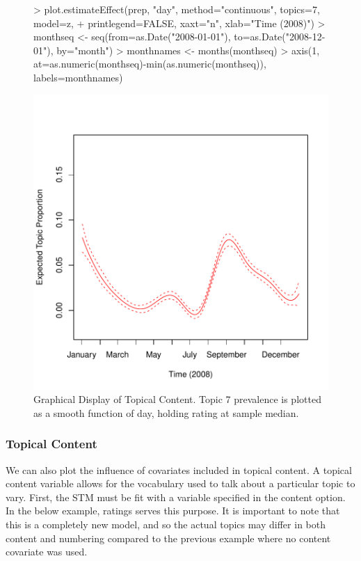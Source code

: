 \documentclass[nojss]{jss}
\begin{document}
\begin{figure}[t!]
\begin{center}
\begin{Schunk}
\begin{Sinput}
> plot.estimateEffect(prep, "day", method="continuous", topics=7, model=z,
+ printlegend=FALSE, xaxt="n", xlab="Time (2008)")
> monthseq <- seq(from=as.Date("2008-01-01"), to=as.Date("2008-12-01"), by="month")
> monthnames <- months(monthseq)
> axis(1, at=as.numeric(monthseq)-min(as.numeric(monthseq)), labels=monthnames)
\end{Sinput}
\end{Schunk}
\includegraphics{stmVignette-016}
\caption{Graphical Display of Topical Content. Topic 7 prevalence is plotted as a smooth function of day, holding rating at sample median.}
\label{fig:spline}
\end{center}
\end{figure}


\subsubsection{Topical Content}
We can also plot the influence of covariates included in topical content. A topical content variable allows for the vocabulary used to talk about a particular topic to vary. First, the STM must be fit with a variable specified in the content option. In the below example, ratings serves this purpose. It is important to note that this is a completely new model, and so the actual topics may differ in both content and numbering compared to the previous example where no content covariate was used.
\end{document}
